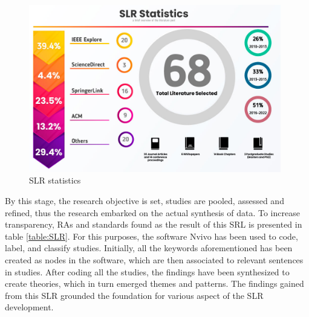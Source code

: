 \documentclass[review]{elsarticle}
\begin{document}
\begin{figure}[h!]
    \centering
    \includegraphics[width=11cm]{databases-statitistic.jpg}
    \caption{SLR statistics}
    \label{fig:SLRStats}
\end{figure}


By this stage, the research objective is set, studies are pooled, assessed and refined, thus the research embarked on the actual synthesis of data. To increase transparency, RAs and standards found as the result of this SRL is presented in table \ref{table:SLR}. For this purposes, the software Nvivo \cite{nvivo} has been used to code, label, and classify studies. Initially, all the keywords aforementioned has been created as nodes in the software, which are then associated to relevant sentences in studies. After coding all the studies, the findings have been synthesized to create theories, which in turn emerged themes and patterns. The findings gained from this SLR grounded the foundation for various aspect of the SLR development. 
\end{document}
